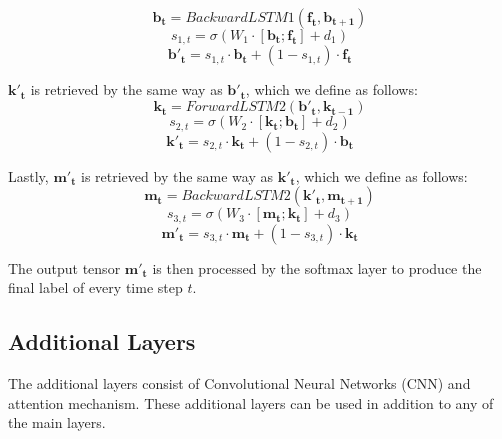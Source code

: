 \begin{equation}
\label{eq:backwardhighway1}
\mathbf{b_{t}} = BackwardLSTM1(\mathbf{f_{t}}, \mathbf{b_{t+1}})
\end{equation}
\begin{equation}
	s_{1,t} = \sigma(W_{1} \cdot [\mathbf{b_{t}}; \mathbf{f_{t}}] + d_{1})
\end{equation}
\begin{equation}
	\mathbf{b'_{t}} = s_{1,t} \cdot \mathbf{b_{t}} + (1 - s_{1,t}) \cdot \mathbf{f_{t}} 
\end{equation}

$\mathbf{k'_{t}}$ is retrieved by the same way as $\mathbf{b'_{t}}$, which we define as follows:
\begin{equation}
\label{eq:forwardhighway2}
\mathbf{k_{t}} = ForwardLSTM2(\mathbf{b'_{t}}, \mathbf{k_{t-1}})
\end{equation}
\begin{equation}
s_{2,t} = \sigma(W_{2} \cdot [\mathbf{k_{t}}; \mathbf{b_{t}}] + d_{2})
\end{equation}
\begin{equation}
\mathbf{k'_{t}} = s_{2,t} \cdot \mathbf{k_{t}} + (1 - s_{2,t}) \cdot \mathbf{b_{t}} 
\end{equation}

Lastly, $\mathbf{m'_{t}}$ is retrieved by the same way as $\mathbf{k'_{t}}$, which we define as follows:
\begin{equation}
\label{eq:backwardhighway2}
\mathbf{m_{t}} = BackwardLSTM2(\mathbf{k'_{t}}, \mathbf{m_{t+1}})
\end{equation}
\begin{equation}
s_{3,t} = \sigma(W_{3} \cdot [\mathbf{m_{t}}; \mathbf{k_{t}}] + d_{3})
\end{equation}
\begin{equation}
\mathbf{m'_{t}} = s_{3,t} \cdot \mathbf{m_{t}} + (1 - s_{3,t}) \cdot \mathbf{k_{t}} 
\end{equation}

The output tensor $\mathbf{m'_{t}}$ is then processed by the softmax layer to produce the final label of every time step $t$.

\subsection{Additional Layers}
The additional layers consist of Convolutional Neural Networks (CNN) and attention mechanism. These additional layers can be used in addition to any of the main layers.

